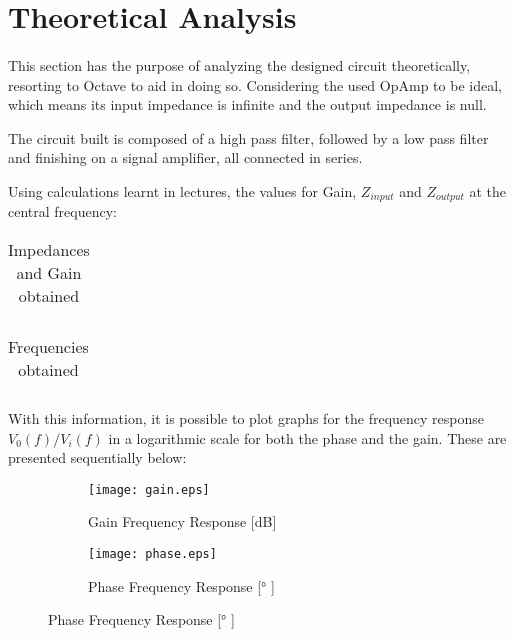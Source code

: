 \section{Theoretical Analysis}
\label{sec:analysis}
\paragraph{}

\par This section has the purpose of analyzing the designed circuit theoretically, resorting to Octave to aid in doing so. Considering the used OpAmp to be ideal, which means its input impedance is infinite and the output impedance is null.
\par The circuit built is composed of a high pass filter, followed by a low pass filter and finishing on a signal amplifier, all connected in series.
\par Using calculations learnt in lectures, the values for Gain, $Z_{input}$ and $Z_{output}$ at the central frequency:

\begin{table}[H]
    \centering
    \begin{tabular}{|c|c|}
    \hline
        
    \end{tabular}
    \caption{Impedances and Gain obtained}
    \label{table4a}
\end{table}

\begin{table}[H]
    \centering
    \begin{tabular}{|c|c|}
    \hline
        
    \end{tabular}
    \caption{Frequencies obtained}
    \label{table4a}
\end{table}

\par With this information, it is possible to plot graphs for the frequency response $V_0(f)/V_i(f)$ in a logarithmic scale for both the phase and the gain. These are presented sequentially below:

\begin{figure}[H]
\centering
\begin{subfigure}{.5\textwidth}
  \centering
  \texttt{[image: gain.eps]}
  \caption{Gain Frequency Response [dB]}
  \label{fig:sim4}
\end{subfigure}%
\begin{subfigure}{.5\textwidth}
  \centering
  \texttt{[image: phase.eps]}
  \caption{Phase Frequency Response [° ]}
  \label{fig:sim5}
\end{subfigure}
\end{figure}
